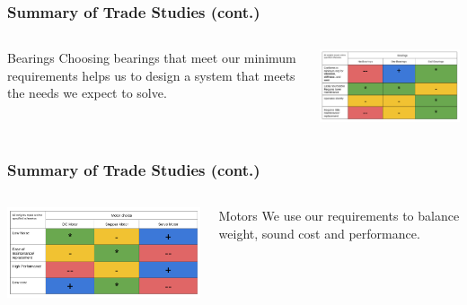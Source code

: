 \documentclass[aspectratio=169]{beamer}
\begin{document}
\begin{frame}
    \frametitle{Summary of Trade Studies (cont.)}

    \begin{columns}
        \begin{column}{0.28\textwidth}
            \begin{block}{Bearings}
                Choosing bearings that meet our minimum requirements
                helps us to design a system that meets the needs we
                expect to solve.
            \end{block}
        \end{column}

        \begin{column}{0.70\textwidth}
            \includegraphics[width=10.5cm]{BearingsTradeStudy}
        \end{column}
    \end{columns}

\end{frame}

\begin{frame}
    \frametitle{Summary of Trade Studies (cont.)}

    \begin{columns}
        \begin{column}{0.70\textwidth}
            \includegraphics[width=10.5cm]{MotorTradeStudy}
        \end{column}

        \begin{column}{0.28\textwidth}
            \begin{block}{Motors}
                We use our requirements to balance weight, sound
                cost and performance.
            \end{block}
        \end{column}
    \end{columns}

\end{frame}
\end{document}
